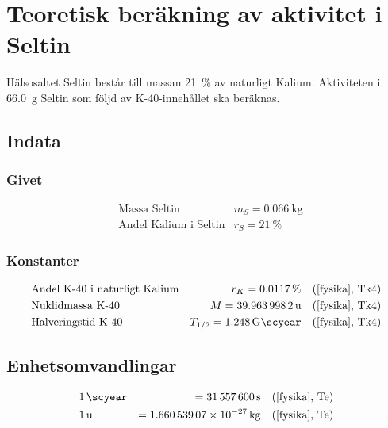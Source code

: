 \section{Teoretisk beräkning av aktivitet i Seltin} \label{sec:seltin}

Hälsosaltet Seltin består till massan \qty{21}{\percent} av naturligt Kalium.
Aktiviteten i \qty{66.0}{\g} Seltin som följd av K-40-innehållet ska beräknas.

\subsection*{Indata}

\subsubsection*{Givet}

\begin{align*}
    & \text{Massa Seltin}          & m_S = \qty{0.066}{\kg} \\
    & \text{Andel Kalium i Seltin} & r_S = \qty{21}{\percent}
\end{align*}

\subsubsection*{Konstanter}

\begin{align*}
    & \text{Andel K-40 i naturligt Kalium} & r_K     = \qty{0.0117}{\percent}            &\quad \fysika{Tk4} \\
    & \text{Nuklidmassa K-40}              & M       = \qty{39.9639982}{\atomicmassunit} &\quad \fysika{Tk4} \\
    & \text{Halveringstid K-40}            & T_{1/2} = \qty{1.248}{\giga\scyear}         &\quad \fysika{Tk4}
\end{align*}

\subsection*{Enhetsomvandlingar}

\begin{align*}
    & \qty{1}{\scyear} &= \qty{31557600}{\s}                &\quad \fysika{Te} \\
    & \qty{1}{\atomicmassunit} &= \qty{1.66053907e-27}{\kg} &\quad \fysika{Te}
\end{align*}

